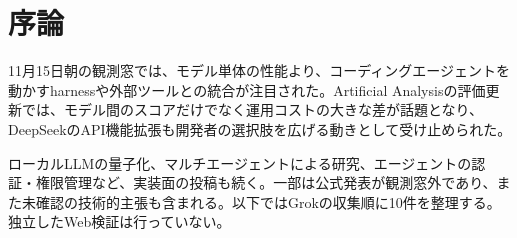 \section{序論}
11月15日朝の観測窓では、モデル単体の性能より、コーディングエージェントを動かすharnessや外部ツールとの統合が注目された。Artificial Analysisの評価更新では、モデル間のスコアだけでなく運用コストの大きな差が話題となり、DeepSeekのAPI機能拡張も開発者の選択肢を広げる動きとして受け止められた。

ローカルLLMの量子化、マルチエージェントによる研究、エージェントの認証・権限管理など、実装面の投稿も続く。一部は公式発表が観測窓外であり、また未確認の技術的主張も含まれる。以下ではGrokの収集順に10件を整理する。独立したWeb検証は行っていない。